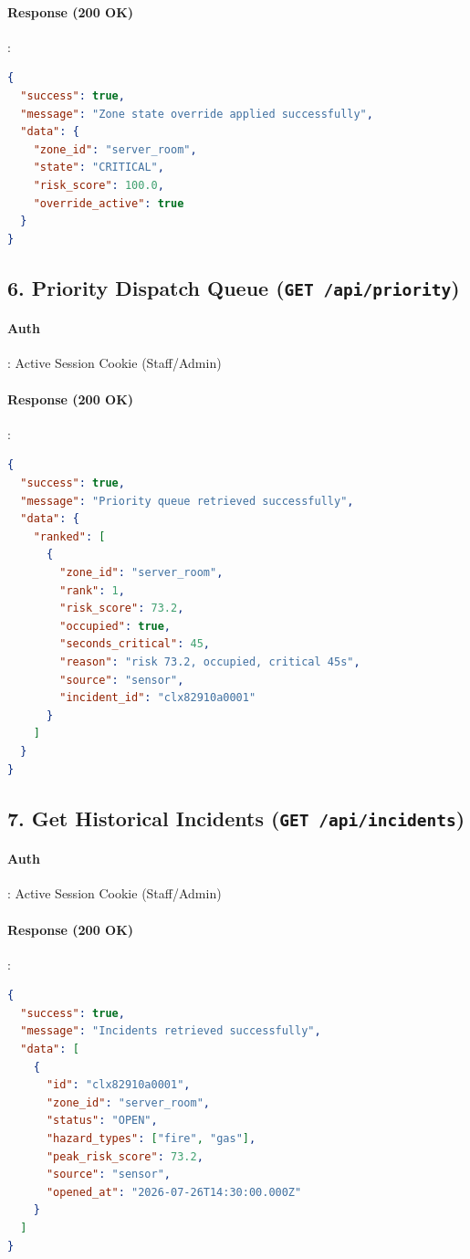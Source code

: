 \documentclass[11pt,a4paper]{article}
\begin{document}
\paragraph{Response (200 OK)}:
\begin{lstlisting}[language=json, samepage=true]
{
  "success": true,
  "message": "Zone state override applied successfully",
  "data": {
    "zone_id": "server_room",
    "state": "CRITICAL",
    "risk_score": 100.0,
    "override_active": true
  }
}
\end{lstlisting}

\subsection{6. Priority Dispatch Queue (\texttt{GET /api/priority})}
\paragraph{Auth}: Active Session Cookie (Staff/Admin)

\paragraph{Response (200 OK)}:
\begin{lstlisting}[language=json, samepage=true]
{
  "success": true,
  "message": "Priority queue retrieved successfully",
  "data": {
    "ranked": [
      {
        "zone_id": "server_room",
        "rank": 1,
        "risk_score": 73.2,
        "occupied": true,
        "seconds_critical": 45,
        "reason": "risk 73.2, occupied, critical 45s",
        "source": "sensor",
        "incident_id": "clx82910a0001"
      }
    ]
  }
}
\end{lstlisting}

\subsection{7. Get Historical Incidents (\texttt{GET /api/incidents})}
\paragraph{Auth}: Active Session Cookie (Staff/Admin)

\paragraph{Response (200 OK)}:
\begin{lstlisting}[language=json, samepage=true]
{
  "success": true,
  "message": "Incidents retrieved successfully",
  "data": [
    {
      "id": "clx82910a0001",
      "zone_id": "server_room",
      "status": "OPEN",
      "hazard_types": ["fire", "gas"],
      "peak_risk_score": 73.2,
      "source": "sensor",
      "opened_at": "2026-07-26T14:30:00.000Z"
    }
  ]
}
\end{lstlisting}
\end{document}
